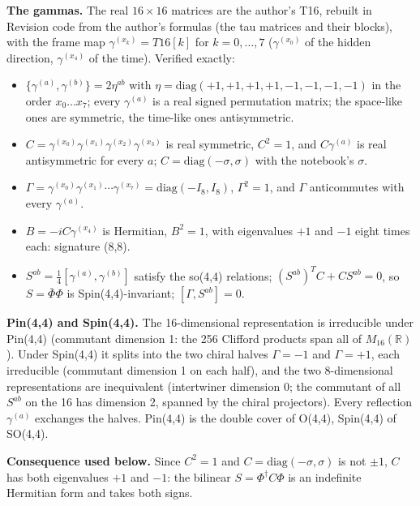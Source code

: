 \documentclass[11pt]{article}
\begin{document}
\textbf{The gammas.} The real $16\times16$ matrices are the author's T16, rebuilt in Revision code from the author's formulas (the tau matrices and their blocks), with the frame map $\gamma^{(x_k)} = T16[k]$ for $k = 0, \dots, 7$ ($\gamma^{(x_0)}$ of the hidden direction, $\gamma^{(x_4)}$ of the time). Verified exactly:

\begin{itemize}
\item $\{\gamma^{(a)}, \gamma^{(b)}\} = 2\eta^{ab}$ with $\eta = \mathrm{diag}(+1,+1,+1,+1,-1,-1,-1,-1)$ in the order $x_0 \ldots x_7$; every $\gamma^{(a)}$ is a real signed permutation matrix; the space-like ones are symmetric, the time-like ones antisymmetric.
\item $C = \gamma^{(x_0)}\gamma^{(x_1)}\gamma^{(x_2)}\gamma^{(x_3)}$ is real symmetric, $C^2 = 1$, and $C\gamma^{(a)}$ is real antisymmetric for every $a$; $C = \mathrm{diag}(-\sigma, \sigma)$ with the notebook's $\sigma$.
\item $\Gamma = \gamma^{(x_0)}\gamma^{(x_1)}\cdots\gamma^{(x_7)} = \mathrm{diag}(-I_8, I_8)$, $\Gamma^2 = 1$, and $\Gamma$ anticommutes with every $\gamma^{(a)}$.
\item $B = -iC\gamma^{(x_4)}$ is Hermitian, $B^2 = 1$, with eigenvalues $+1$ and $-1$ eight times each: signature (8,8).
\item $S^{ab} = \tfrac14[\gamma^{(a)}, \gamma^{(b)}]$ satisfy the so(4,4) relations; $(S^{ab})^T C + C S^{ab} = 0$, so $S = \bar\Phi\Phi$ is Spin(4,4)-invariant; $[\Gamma, S^{ab}] = 0$.
\end{itemize}

\textbf{Pin(4,4) and Spin(4,4).} The 16-dimensional representation is irreducible under Pin(4,4) (commutant dimension 1: the 256 Clifford products span all of $M_{16}(\mathbb{R})$). Under Spin(4,4) it splits into the two chiral halves $\Gamma = -1$ and $\Gamma = +1$, each irreducible (commutant dimension 1 on each half), and the two 8-dimensional representations are inequivalent (intertwiner dimension 0; the commutant of all $S^{ab}$ on the 16 has dimension 2, spanned by the chiral projectors). Every reflection $\gamma^{(a)}$ exchanges the halves. Pin(4,4) is the double cover of O(4,4), Spin(4,4) of SO(4,4).

\textbf{Consequence used below.} Since $C^2 = 1$ and $C = \mathrm{diag}(-\sigma, \sigma)$ is not $\pm1$, $C$ has both eigenvalues $+1$ and $-1$: the bilinear $S = \Phi^\dagger C\Phi$ is an indefinite Hermitian form and takes both signs.
\end{document}
